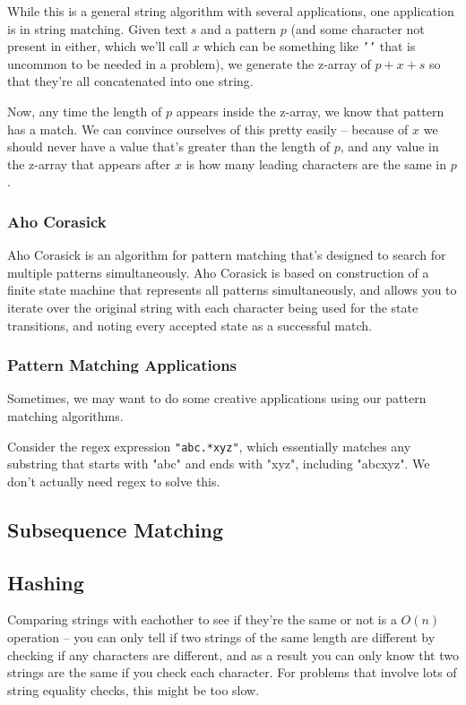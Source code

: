 While this is a general string algorithm with several applications, one application is in string matching. Given text $s$ and a pattern $p$ (and some character not present in either, which we'll call $x$ which can be something like \texttt{'\n'} that is uncommon to be needed in a problem), we generate the z-array of $p+x+s$ so that they're all concatenated into one string.

Now, any time the length of $p$ appears inside the z-array, we know that pattern has a match. We can convince ourselves of this pretty easily -- because of $x$ we should never have a value that's greater than the length of $p$, and any value in the z-array that appears after $x$ is how many leading characters are the same in $p$.

\subsubsection{Aho Corasick}

Aho Corasick is an algorithm for pattern matching that's designed to search for multiple patterns simultaneously. Aho Corasick is based on construction of a finite state machine that represents all patterns simultaneously, and allows you to iterate over the original string with each character being used for the state transitions, and noting every accepted state as a successful match.

\subsubsection{Pattern Matching Applications}

Sometimes, we may want to do some creative applications using our pattern matching algorithms.

Consider the regex expression \texttt{"abc.*xyz"}, which essentially matches any substring that starts with "abc" and ends with "xyz", including "abcxyz". We don't actually need regex to solve this.

\subsection{Subsequence Matching}
\subsection{Hashing}

Comparing strings with eachother to see if they're the same or not is a $O(n)$ operation -- you can only tell if two strings of the same length are different by checking if any characters are different, and as a result you can only know tht two strings are the same if you check each character. For problems that involve lots of string equality checks, this might be too slow.

